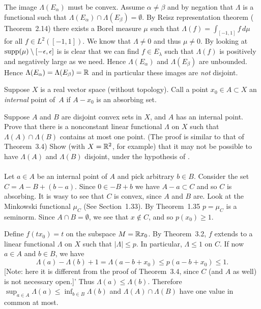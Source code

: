 \begin{enumerate}
The image \(\Lambda(E_\alpha)\) must be convex.
Assume \(\alpha\neq\beta\) and by negation that \(\Lambda\) is a functional
such that \(\Lambda(E_\alpha)\cap \Lambda(E_\beta) = \emptyset\).
By  Reisz representation theorem
(\cite{RudinRCA87} Theorem~2.14) there exists a Borel measure \(\mu\)
such that \(\Lambda(f) = \int_{[-1,1]}f\,d\mu\) for all \(f\in L^2([-1,1])\).
We know that \(\Lambda\neq 0\) and thus \(\mu\neq 0\). By looking
at \(\mathop{\rm supp}\nolimits(\mu)\setminus[-\epsilon,\epsilon]\)
is is clear that we can find \(f\in E_\lambda\)
such that \(\Lambda(f)\) is positively and negatively large as we need. Hence
\(\Lambda(E_\alpha)\) and \(\Lambda(E_\beta)\) are unbounded.
Hence \(\Lambda(E_\alpha)=\Lambda(E_\beta)=\mathbb{R}\)
and in particular these images are \emph{not} disjoint.


\begin{excopy}
Suppose $X$ is a real vector space (without topology).
Call a point \(x_0\in A\subset X\) an \emph{internal} point of~$A$ if
\(A-x_0\) is an absorbing set.
\begin{itemize}
 Suppose $A$ and $B$ are disjoint convex sets in $X$, and $A$
has an internal point.
Prove that there is a nonconstant linear functional \(\Lambda\)
on $X$ such that \(\Lambda(A)\cap \Lambda(B)\) contains at most one point.
(The proof is similar to that of Theorem~3.4)
 Show (with \(X=\mathbb{R}^2\), for example) that it may not be possible
to have \(\Lambda(A)\) and \(\Lambda(B)\) disjoint, under the hypothesis
of .
\end{itemize}
\end{excopy}

\paragraph{}
Let \(a\in A\) be an internal point of $A$ and pick arbitrary \(b\in B\).
Consider the set \(C = A - B + (b-a)\).
Since \(0\in -B+b\) we have \(A-a\subset C\) and so $C$ is absorbing.
It is wasy to see that $C$ is convex, since $A$ and $B$ are.
Look at the
 Minkowski functional \(\mu_C\) (See Section~1.33).
By Theorem~1.35 \(p=\mu_C\) is a seminorm.
Since \(A\cap B=\emptyset\),
we see that \(x\notin C\), and so \(p(x_0)\geq 1\).

Define \(f(tx_0) = t\) on the subspace \(M=\mathbb{R} x_0\).
By Theorem~3.2, $f$ extends to a linear functional \(\Lambda\) on $X$
such that \(|\Lambda| \leq p\). In particular, \(\Lambda \leq 1\) on $C$.
If now \(a\in A\) and \(b\in B\), we have
\begin{equation*}
\Lambda(a) - \Lambda(b) + 1
= \Lambda(a - b + x_0) \leq p(a-b + x_0) \leq 1.
\end{equation*}
{\small[Note: here it is different from the proof of Theorem~3.4, since
 $C$ (and $A$ as well) is not necessary open.]}'
Thus \(\Lambda(a) \leq \Lambda(b)\).
Therefore \(\sup_{a\in A} \Lambda(a) \leq \inf_{b\in B} \Lambda(b)\)
and \(\Lambda(A)\cap\Lambda(B)\) have one value in common at most.



\end{enumerate}
